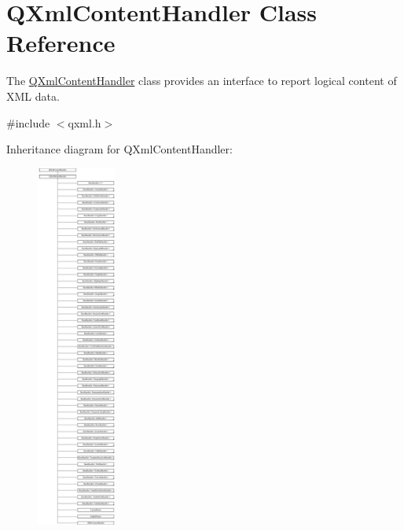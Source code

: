 \hypertarget{class_q_xml_content_handler}{}\section{Q\+Xml\+Content\+Handler Class Reference}
\label{class_q_xml_content_handler}


The \mbox{\hyperlink{class_q_xml_content_handler}{Q\+Xml\+Content\+Handler}} class provides an interface to report logical content of X\+ML data.  




{\ttfamily \#include $<$qxml.\+h$>$}

Inheritance diagram for Q\+Xml\+Content\+Handler\+:\begin{figure}[H]
\begin{center}
\leavevmode
\includegraphics[height=12.000000cm]{class_q_xml_content_handler}
\end{center}
\end{figure}
